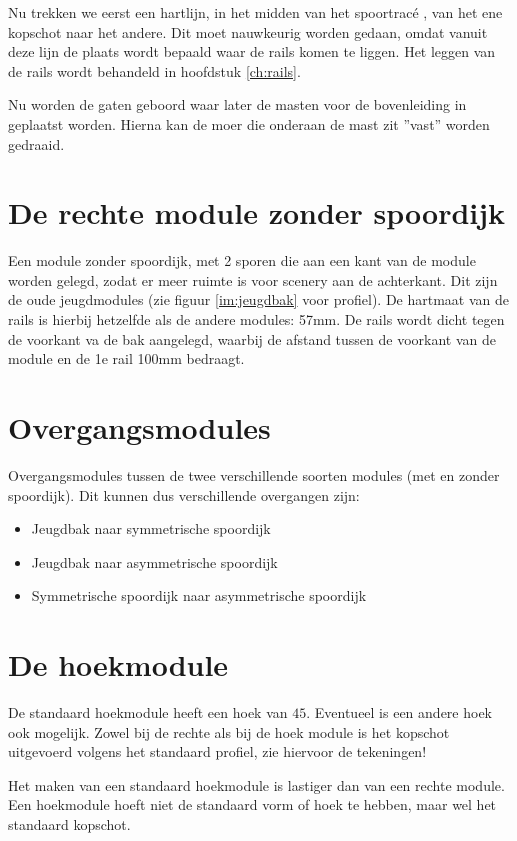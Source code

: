 \documentclass[12pt,a4paper]{report}
\newcommand*{\trace}{trac\'{e} }
\begin{document}
Nu trekken we eerst een hartlijn, in het midden van het spoor\trace, van het ene kopschot naar het andere. Dit moet nauwkeurig worden gedaan, omdat vanuit deze lijn de plaats wordt bepaald waar de rails komen te liggen.
Het leggen van de rails wordt behandeld in hoofdstuk \ref{ch:rails}.

Nu worden de gaten geboord waar later de masten voor de bovenleiding in geplaatst worden. 
Hierna kan de moer die onderaan de mast zit ''vast'' worden gedraaid.

\section{De rechte module zonder spoordijk}
Een module zonder spoordijk, met 2 sporen die aan een kant van de module worden gelegd, zodat er meer ruimte is voor scenery aan de achterkant. Dit zijn de oude jeugdmodules (zie figuur \ref{im:jeugdbak} voor profiel).
De hartmaat van de rails is hierbij hetzelfde als de andere modules: 57mm. De rails wordt dicht tegen de voorkant va de bak aangelegd, waarbij de afstand tussen de voorkant van de module en de 1e rail 100mm bedraagt.

\section{Overgangsmodules}
Overgangsmodules tussen de twee verschillende soorten modules (met en zonder spoordijk). Dit kunnen dus verschillende overgangen zijn:
\begin{itemize}
\item Jeugdbak naar symmetrische spoordijk
\item Jeugdbak naar asymmetrische spoordijk
\item Symmetrische spoordijk naar asymmetrische spoordijk
\end{itemize}

\section{De hoekmodule}
De standaard hoekmodule heeft een hoek van $45$\textdegree. Eventueel is een andere hoek ook mogelijk.
Zowel bij de rechte als bij de hoek module is het kopschot uitgevoerd volgens het standaard profiel, zie hiervoor de tekeningen!

Het maken van een standaard hoekmodule is lastiger dan van een rechte module. Een hoekmodule hoeft niet de standaard vorm of hoek te hebben, maar wel het standaard kopschot.
\end{document}
